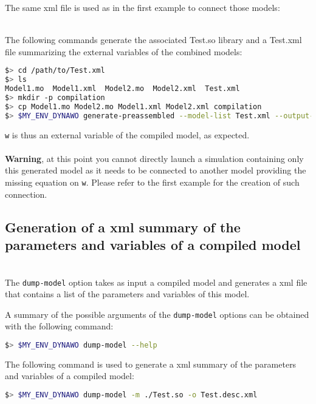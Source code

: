 \documentclass[a4paper, 12pt]{report}
\begin{document}
The same xml file is used as in the first example to connect those models:


 ~~\\
The following commands generate the associated Test.so library and a Test.xml file summarizing the external variables of the combined models:
\begin{lstlisting}[language=bash,deletekeywords={jobs,help}]
$> cd /path/to/Test.xml
$> ls
Model1.mo  Model1.xml  Model2.mo  Model2.xml  Test.xml
$> mkdir -p compilation
$> cp Model1.mo Model2.mo Model1.xml Model2.xml compilation
$> $MY_ENV_DYNAWO generate-preassembled --model-list Test.xml --output-dir compilation --non-recursive-modelica-models-dir .
\end{lstlisting}


\lstinline[language=Modelica]{w} is thus an external variable of the compiled model, as expected. \\
~~\\
\textbf{Warning}, at this point you cannot directly launch a simulation containing only this generated model as it needs to be connected to another model providing the missing equation on \lstinline[language=Modelica]{w}. Please refer to the first example for the creation of such connection.

\subsection{Generation of a xml summary of the parameters and variables of a compiled model} 
~~\\
The \lstinline[language=bash]{dump-model} option takes as input a compiled \Dynawo model and generates a xml file that contains a list of the parameters and variables of this model.

A summary of the possible arguments of the \lstinline[language=bash]{dump-model} options can be obtained with the following command:
\begin{lstlisting}[language=bash,deletekeywords={jobs,help}]
$> $MY_ENV_DYNAWO dump-model --help
\end{lstlisting}

The following command is used to generate a xml summary of the parameters and variables of a compiled model:
\begin{lstlisting}[language=bash,deletekeywords={jobs,help}]
$> $MY_ENV_DYNAWO dump-model -m ./Test.so -o Test.desc.xml
\end{lstlisting}
\end{document}

